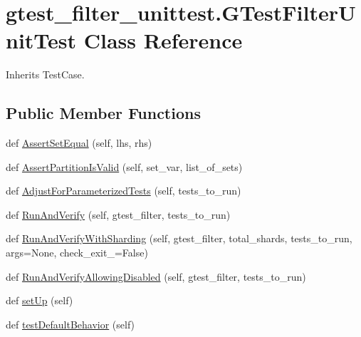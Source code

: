 \hypertarget{classgtest__filter__unittest_1_1GTestFilterUnitTest}{}\section{gtest\+\_\+filter\+\_\+unittest.\+G\+Test\+Filter\+Unit\+Test Class Reference}
\label{classgtest__filter__unittest_1_1GTestFilterUnitTest}


Inherits Test\+Case.

\subsection*{Public Member Functions}
\begin{DoxyCompactItemize}
\item 
def \mbox{\hyperlink{classgtest__filter__unittest_1_1GTestFilterUnitTest_aeebdbdcc59594ad0a69cf11eafe94997}{Assert\+Set\+Equal}} (self, lhs, rhs)
\item 
def \mbox{\hyperlink{classgtest__filter__unittest_1_1GTestFilterUnitTest_a87656eac0cf4136252eef43da0121381}{Assert\+Partition\+Is\+Valid}} (self, set\+\_\+var, list\+\_\+of\+\_\+sets)
\item 
def \mbox{\hyperlink{classgtest__filter__unittest_1_1GTestFilterUnitTest_a11c48bf404bca6806b14a1a71d169ace}{Adjust\+For\+Parameterized\+Tests}} (self, tests\+\_\+to\+\_\+run)
\item 
def \mbox{\hyperlink{classgtest__filter__unittest_1_1GTestFilterUnitTest_acf341ed9a265b346a050afa9a9a85c65}{Run\+And\+Verify}} (self, gtest\+\_\+filter, tests\+\_\+to\+\_\+run)
\item 
def \mbox{\hyperlink{classgtest__filter__unittest_1_1GTestFilterUnitTest_a2022ed99e18a6e5afd1023b9dd19d6e0}{Run\+And\+Verify\+With\+Sharding}} (self, gtest\+\_\+filter, total\+\_\+shards, tests\+\_\+to\+\_\+run, args=None, check\+\_\+exit\+\_=False)
\item 
def \mbox{\hyperlink{classgtest__filter__unittest_1_1GTestFilterUnitTest_ae52bd70ef1dcb68c83c0379ddfb987a9}{Run\+And\+Verify\+Allowing\+Disabled}} (self, gtest\+\_\+filter, tests\+\_\+to\+\_\+run)
\item 
def \mbox{\hyperlink{classgtest__filter__unittest_1_1GTestFilterUnitTest_af20a71b1659314a5cc1093d77a673495}{set\+Up}} (self)
\item 
def \mbox{\hyperlink{classgtest__filter__unittest_1_1GTestFilterUnitTest_adef3a9b539c73bda785a631a5aac424f}{test\+Default\+Behavior}} (self)

\end{DoxyCompactItemize}
